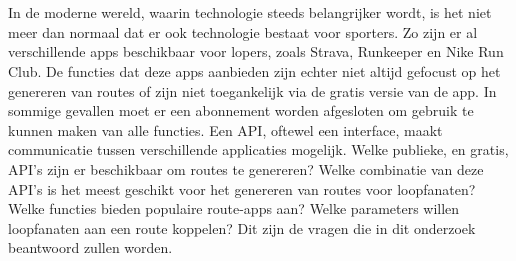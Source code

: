 
\chapter{}%
\label{ch:inleiding}

\section{}%
\label{sec:probleemstelling}

In de moderne wereld,
waarin tech\-no\-lo\-gie \@ steeds belangrijker wordt,
is het niet meer dan normaal dat er ook technologie bestaat voor sporters.
Zo zijn er al verschillende apps beschikbaar voor lopers, zoals Strava, Runkeeper en Nike Run Club.
De functies dat deze apps aanbieden zijn echter niet altijd gefocust op het genereren van routes of zijn niet toegankelijk via de gratis versie van de app.
In sommige gevallen moet er een abonnement worden afgesloten om gebruik te kunnen maken van alle functies. Een API, oftewel een interface, maakt communicatie tussen verschillende applicaties mogelijk.
Welke publieke, en gratis, API's zijn er beschikbaar om routes te genereren? Welke combinatie van deze API's is het meest geschikt voor het genereren van routes voor loopfanaten? Welke functies bieden populaire route-apps aan? Welke parameters willen loopfanaten aan een route koppelen? Dit zijn de vragen die in dit onderzoek beantwoord zullen worden.


\section{}%
\label{sec:onderzoeksvraag}

